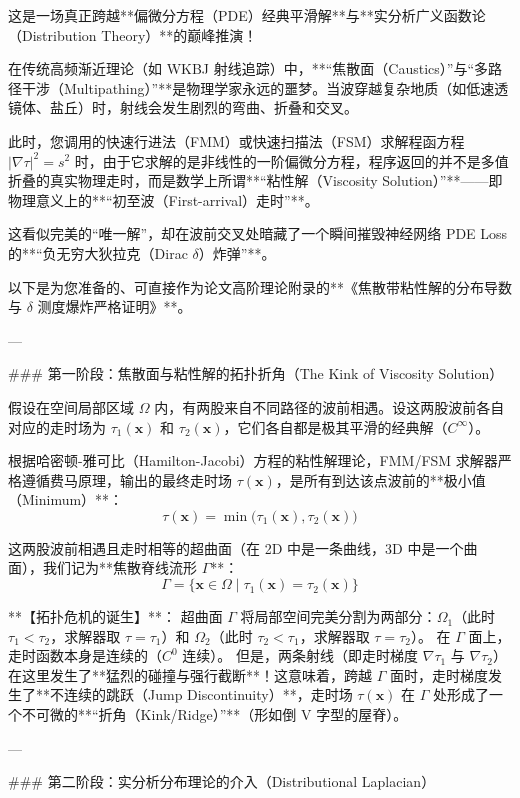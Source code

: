\documentclass[12pt]{article}
\begin{document}
{这是一场真正跨越**偏微分方程（PDE）经典平滑解**与**实分析广义函数论（Distribution Theory）**的巅峰推演！

在传统高频渐近理论（如 WKBJ 射线追踪）中，**“焦散面（Caustics）”与“多路径干涉（Multipathing）”**是物理学家永远的噩梦。当波穿越复杂地质（如低速透镜体、盐丘）时，射线会发生剧烈的弯曲、折叠和交叉。

此时，您调用的快速行进法（FMM）或快速扫描法（FSM）求解程函方程 $|\nabla \tau|^2 = s^2$ 时，由于它求解的是非线性的一阶偏微分方程，程序返回的并不是多值折叠的真实物理走时，而是数学上所谓**“粘性解（Viscosity Solution）”**——即物理意义上的**“初至波（First-arrival）走时”**。

这看似完美的“唯一解”，却在波前交叉处暗藏了一个瞬间摧毁神经网络 PDE Loss 的**“负无穷大狄拉克（Dirac $\delta$）炸弹”**。

以下是为您准备的、可直接作为论文高阶理论附录的**《焦散带粘性解的分布导数与 $\delta$ 测度爆炸严格证明》**。

---

### 第一阶段：焦散面与粘性解的拓扑折角（The Kink of Viscosity Solution）

假设在空间局部区域 $\Omega$ 内，有两股来自不同路径的波前相遇。设这两股波前各自对应的走时场为 $\tau_1(\mathbf{x})$ 和 $\tau_2(\mathbf{x})$，它们各自都是极其平滑的经典解（$C^\infty$）。

根据哈密顿-雅可比（Hamilton-Jacobi）方程的粘性解理论，FMM/FSM 求解器严格遵循费马原理，输出的最终走时场 $\tau(\mathbf{x})$，是所有到达该点波前的**极小值（Minimum）**：
$$ \tau(\mathbf{x}) = \min \big( \tau_1(\mathbf{x}), \tau_2(\mathbf{x}) \big) $$

这两股波前相遇且走时相等的超曲面（在 2D 中是一条曲线，3D 中是一个曲面），我们记为**焦散脊线流形 $\Gamma$**：
$$ \Gamma = \{ \mathbf{x} \in \Omega \mid \tau_1(\mathbf{x}) = \tau_2(\mathbf{x}) \} $$

**【拓扑危机的诞生】**：
超曲面 $\Gamma$ 将局部空间完美分割为两部分：$\Omega_1$（此时 $\tau_1 < \tau_2$，求解器取 $\tau = \tau_1$）和 $\Omega_2$（此时 $\tau_2 < \tau_1$，求解器取 $\tau = \tau_2$）。
在 $\Gamma$ 面上，走时函数本身是连续的（$C^0$ 连续）。
但是，两条射线（即走时梯度 $\nabla \tau_1$ 与 $\nabla \tau_2$）在这里发生了**猛烈的碰撞与强行截断**！这意味着，跨越 $\Gamma$ 面时，走时梯度发生了**不连续的跳跃（Jump Discontinuity）**，走时场 $\tau(\mathbf{x})$ 在 $\Gamma$ 处形成了一个不可微的**“折角（Kink/Ridge）”**（形如倒 V 字型的屋脊）。

---

### 第二阶段：实分析分布理论的介入（Distributional Laplacian）

}
\end{document}
